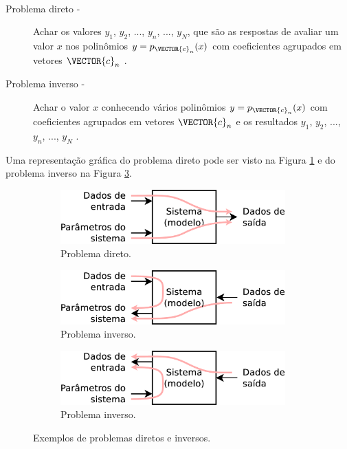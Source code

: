 \begin{example}~
\begin{description}
\item[Problema direto -] Achar os valores $y_1$, $y_2$, ..., $y_n$, ..., $y_N$, 
que são as respostas de avaliar um valor $x$ nos polinômios 
$y=p_{\VECTOR{c}_n}(x)$ com coeficientes agrupados em vetores $\VECTOR{c}_n$ \cite{Keller76}.
\item[Problema inverso -] Achar o valor $x$
conhecendo vários polinômios $y=p_{\VECTOR{c}_n}(x)$ com coeficientes agrupados em vetores $\VECTOR{c}_n$ e
os resultados $y_1$, $y_2$, ..., $y_n$, ..., $y_N$  \cite{Keller76}.
\end{description}
Uma representação gráfica do problema direto pode ser visto na Figura \ref{fig:inverso-diretos:direto1}
e do problema inverso na Figura \ref{fig:inverso-diretos:inverso2}.
\end{example}

\begin{figure}[!h]
     \centering
     \begin{subfigure}[b]{0.49\textwidth}
         \centering
         \includegraphics[width=0.95\textwidth]{chapters/notacao/direto1.eps}
         \caption{Problema direto.}
         \label{fig:inverso-diretos:direto1}
     \end{subfigure}
     \hfill
     \begin{subfigure}[b]{0.49\textwidth}
         \centering
         \includegraphics[width=0.95\textwidth]{chapters/notacao/inverso1.eps}
         \caption{Problema inverso.}
         \label{fig:inverso-diretos:inverso1}
     \end{subfigure}
     \hfill
     \begin{subfigure}[b]{0.49\textwidth}
         \centering
         \includegraphics[width=0.95\textwidth]{chapters/notacao/inverso2.eps}
         \caption{Problema inverso.}
         \label{fig:inverso-diretos:inverso2}
     \end{subfigure}
        \caption{Exemplos de problemas diretos e inversos.}
        \label{fig:inverso-diretos}
\end{figure}

